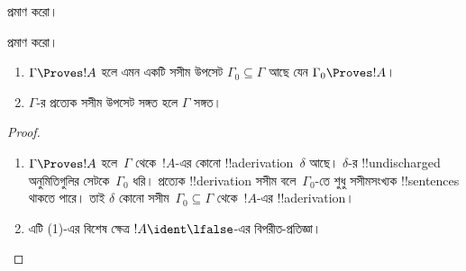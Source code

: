 \documentclass[../../../include/open-logic-section]{subfiles}
\begin{document}
\begin{prob}
 প্রমাণ করো।
\end{prob}
\tagendprob

\begin{prob}
 প্রমাণ করো।
\end{prob}
\tagendprob

\begin{prop}[সংহতি]
  \begin{enumerate}
  \item $\Gamma \Proves !A$ হলে এমন একটি সসীম উপসেট $\Gamma_0
    \subseteq \Gamma$ আছে যেন $\Gamma_0 \Proves !A$।
  \item $\Gamma$-র প্রত্যেক সসীম উপসেট সঙ্গত হলে $\Gamma$ সঙ্গত।
  \end{enumerate}
\end{prop}

\begin{proof}
  \begin{enumerate}
    \item $\Gamma \Proves !A$ হলে~$\Gamma$ থেকে~$!A$-এর কোনো
      !!a{derivation}~$\delta$ আছে। $\delta$-র !!{undischarged}
      অনুমিতিগুলির সেটকে~$\Gamma_0$ ধরি। প্রত্যেক !!{derivation}
      সসীম বলে~$\Gamma_0$-তে শুধু সসীমসংখ্যক !!{sentence}s থাকতে পারে।
      তাই $\delta$ কোনো সসীম~$\Gamma_0 \subseteq \Gamma$ থেকে~$!A$-এর
      !!a{derivation}।
    \item এটি (1)-এর বিশেষ ক্ষেত্র $!A \ident \lfalse$-এর
      বিপরীত-প্রতিজ্ঞা।
  \end{enumerate}
\end{proof}
\end{document}

